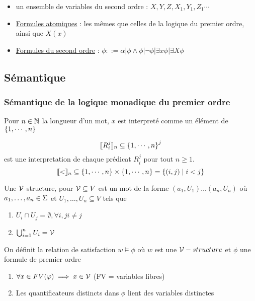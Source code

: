 \begin{definition} 
	\begin{itemize}
		\item un ensemble de variables du second ordre : $X,Y,Z,X_1,Y_1,Z_1 \cdots$
		\item \underline{Formules atomiques} : les mêmes que celles de la logique du premier ordre, ainsi que $X(x)$
		\item \underline{Formules du second ordre} : $\phi ::= \alpha | \phi \land \phi | \lnot \phi | \exists x \phi | \exists X \phi$
	\end{itemize}
\end{definition}


\subsection{Sémantique}

\subsubsection{Sémantique de la logique monadique du premier ordre}

Pour $n \in \mathbb{N}$ la longueur d'un mot, $x$ est interpreté comme un élément de $\left\{1, \cdots, n\right\}$

$$ \llbracket R_i^j \rrbracket_n \subseteq \left\{1, \cdots, n\right\}^j$$
est une interpretation de chaque prédicat $R_i^j$ pour tout $n \geq 1$.
$$ \llbracket < \rrbracket_n \subseteq \left\{1, \cdots, n\right\} \times \left\{1, \cdots, n\right\} = \left\{(i,j) \mid i<j\right\}$$


\begin{definition}
	Une $\mathcal{V}$-structure, pour $\mathcal{V} \subseteq V$ est un mot de la forme $(a_1, U_1) \ldots (a_n, U_n)$ où $a_1, \ldots, a_n \in \Sigma$ et
	$U_1, \ldots, U_n \subseteq V$ tels que

	\begin{enumerate}
		\item $U_i \cap U_j = \emptyset, \forall i,j i \neq j$
		\item  $\bigcup_{i=1}^n U_i = \mathcal{V}$
	\end{enumerate}
\end{definition}

\begin{definition}
	On définit la relation de satisfaction $w \models \phi$ où $w$ est une $\mathcal{V}-structure$ et $\phi$ une formule de premier ordre \tq
	\begin{enumerate}
		\item $\forall x \in FV(\varphi) \implies x \in \mathcal{V}$ (FV = variables libres)
		\item Les quantificateurs distincts dans $\phi$ lient des variables distinctes
	\end{enumerate}
\end{definition}

